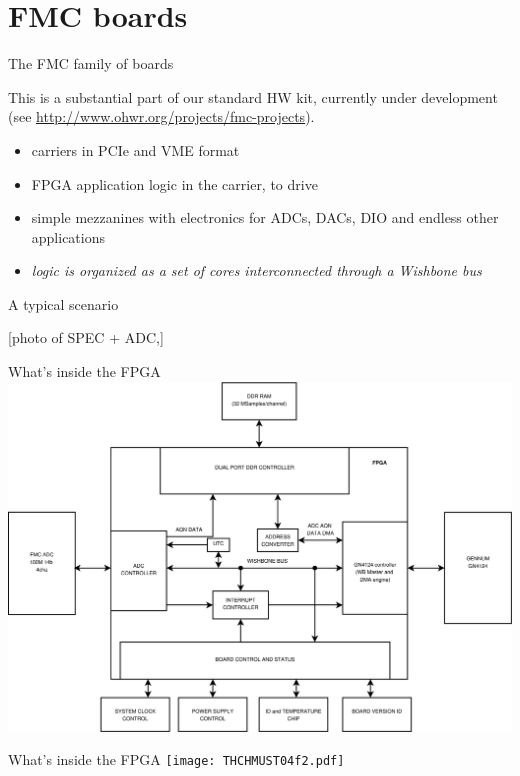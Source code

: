 \documentclass{beamer}
\begin{document}
\section{FMC boards}
\begin{frame}{The FMC family of boards}

This is a substantial part of our standard HW kit, currently under
development\\
(see \url{http://www.ohwr.org/projects/fmc-projects}).

\begin{itemize}
\item carriers in PCIe and VME format
\item FPGA application logic in the carrier, to drive
\item simple mezzanines with electronics for ADCs, DACs, DIO and endless
    other applications
\item \emph{logic is organized as a set of cores interconnected through a
    Wishbone bus}
\end{itemize}

\end{frame}

\begin{frame}{A typical scenario}

[photo of SPEC + ADC,]

\end{frame}

\begin{frame}{What's inside the FPGA}
\includegraphics[height=0.8\textheight]{block_diagram_talk.pdf}
\end{frame}

\begin{frame}{What's inside the FPGA}
\texttt{[image: THCHMUST04f2.pdf]}
\end{frame}
\end{document}

